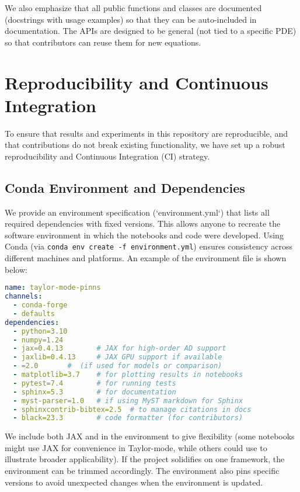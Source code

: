 \documentclass[11pt]{article}
\begin{document}
We also emphasize that all public functions and classes are documented (docstrings with usage examples) so that they can be auto-included in documentation. The APIs are designed to be general (not tied to a specific PDE) so that contributors can reuse them for new equations.

\section{Reproducibility and Continuous Integration}
\label{sec:ci}

To ensure that results and experiments in this repository are reproducible, and that contributions do not break existing functionality, we have set up a robust reproducibility and Continuous Integration (CI) strategy.

\subsection{Conda Environment and Dependencies}

We provide an environment specification (`environment.yml`) that lists all required dependencies with fixed versions. This allows anyone to recreate the software environment in which the notebooks and code were developed. Using Conda (via \texttt{conda env create -f environment.yml}) ensures consistency across different machines and platforms. An example of the environment file is shown below:

\begin{lstlisting}[language=Yaml, caption=environment.yml (conda environment)]
name: taylor-mode-pinns
channels:
  - conda-forge
  - defaults
dependencies:
  - python=3.10
  - numpy=1.24
  - jax=0.4.13        # JAX for high-order AD support
  - jaxlib=0.4.13     # JAX GPU support if available
  - =2.0       #  (if used for models or comparison)
  - matplotlib=3.7    # for plotting results in notebooks
  - pytest=7.4        # for running tests
  - sphinx=5.3        # for documentation
  - myst-parser=1.0   # if using MyST markdown for Sphinx
  - sphinxcontrib-bibtex=2.5  # to manage citations in docs
  - black=23.3        # code formatter (for contributors)
\end{lstlisting}

We include both JAX and  in the environment to give flexibility (some notebooks might use JAX for convenience in Taylor-mode, while others could use  to illustrate broader applicability). If the project solidifies on one framework, the environment can be trimmed accordingly. The environment also pins specific versions to avoid unexpected changes when the environment is updated. 
\end{document}
